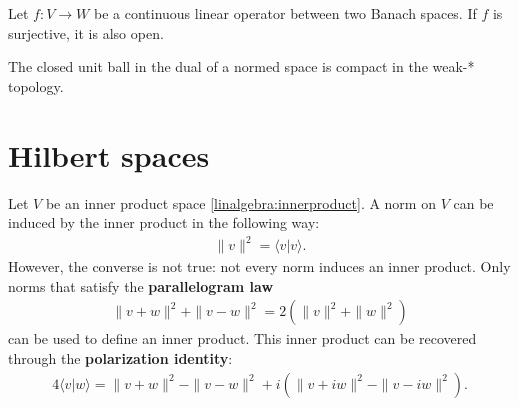     \begin{theorem}
        Let $f:V\rightarrow W$ be a continuous linear operator between two Banach spaces. If $f$ is surjective, it is also open.
    \end{theorem}

    \begin{theorem}
        The closed unit ball in the dual of a normed space is compact in the weak-* topology.
    \end{theorem}


\section{Hilbert spaces}

    \begin{remark}
        Let $V$ be an inner product space \ref{linalgebra:innerproduct}. A norm on $V$ can be induced by the inner product in the following way:
        \begin{gather}
            \label{functional:inner_product_norm}
            \|v\|^2 = \langle v|v \rangle.
        \end{gather}
        However, the converse is not true: not every norm induces an inner product. Only norms that satisfy the \textbf{parallelogram law}
        \begin{gather}
            \label{functional:parallellogram_law}
            \|v+w\|^2 + \|v-w\|^2 = 2(\|v\|^2 + \|w\|^2)
        \end{gather}
        can be used to define an inner product. This inner product can be recovered through the \textbf{polarization identity}:
        \begin{gather}
            \label{functional:polarization_identity}
            4 \langle v|w \rangle = \|v+w\|^2 - \|v-w\|^2 + i\left(\|v+iw\|^2 - \|v-iw\|^2\right).
        \end{gather}
    \end{remark}

